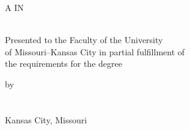 \begin{center}
\thispagestyle{empty} %

\setlength{\baselineskip}{14pt}
\vspace*{.2in}

\normalsize{
  \doublespacing 
  \MakeUppercase{\MyThesisTitle}
} 
\normalsize

\setlength{\baselineskip}{13pt}
\vspace*{1.25in}

A \MakeUppercase{\ThesisOrDissertation} IN\\
\vspace{0.1in}
\MyField \\
\vspace{0.5in}

Presented to the Faculty of the University\\
of Missouri--Kansas City in partial fulfillment of\\
the requirements for the degree

\vspace{0.5in}
\MakeUppercase{\MyDegree}
\vspace{0.95in}

by \\
\vspace{0.1in}
\MakeUppercase{\MyName} \\
\vspace{0.15in} 
\MyPrevDegree \\

\vspace{1in}
Kansas City, Missouri\\
\MyDegreeAwardYear

\end{center}\newpage
